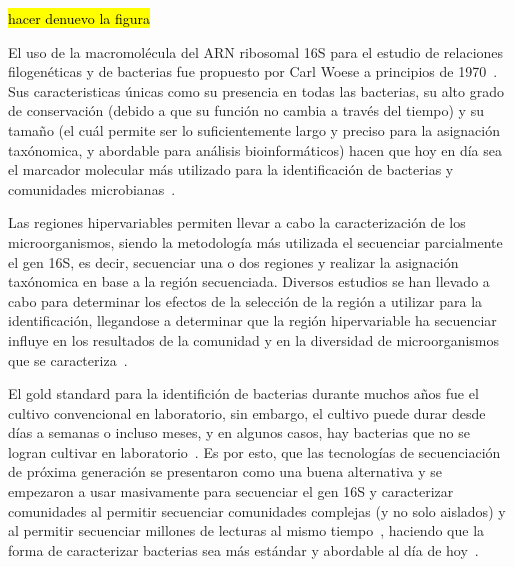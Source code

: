 \hl{hacer denuevo la figura}

El uso de la macromolécula del ARN ribosomal  16S para el estudio de relaciones filogenéticas y de bacterias fue propuesto por Carl Woese a principios de 1970~\cite{olsen1993ribosomal}.
Sus caracteristicas únicas como su presencia en todas las bacterias, su alto grado de conservación (debido a que su función no cambia a través del tiempo) y su tamaño (el cuál permite ser lo suficientemente largo y preciso para la asignación taxónomica, y abordable para análisis bioinformáticos) hacen que hoy en día sea el marcador molecular más utilizado para la identificación de bacterias y comunidades microbianas~\cite{reller2007detection,janda200716s,lopez2023determining,patel200116s}.


Las regiones hipervariables permiten llevar a cabo la caracterización de los microorganismos, siendo la metodología más utilizada el secuenciar parcialmente el gen 16S, es decir, secuenciar una o dos regiones y realizar la asignación taxónomica en base a la región secuenciada. Diversos estudios se han llevado a cabo para determinar los efectos de la selección de la región a utilizar para la identificación, llegandose a determinar que la región hipervariable ha secuenciar influye en los resultados de la comunidad y en la diversidad de microorganismos que se caracteriza~\cite{klindworth2013evaluation,mizrahi2013taxonomic,guo2013taxonomic,soergel2012selection}.




El gold standard para la identifición de bacterias durante muchos años fue el cultivo convencional en laboratorio, sin embargo, el cultivo puede durar desde días a semanas o incluso meses, y en algunos casos, hay bacterias que no se logran cultivar en laboratorio~\cite{didelot2012transforming}. 
Es por esto, que las tecnologías de secuenciación de próxima generación se presentaron como una buena alternativa y se empezaron a usar masivamente para secuenciar el gen 16S y caracterizar comunidades al permitir secuenciar comunidades complejas (y no solo aislados) y al permitir secuenciar millones de lecturas al mismo tiempo~\cite{reller2007detection}, haciendo que la forma de caracterizar bacterias sea más estándar y abordable al día de hoy~\cite{woo2008then, tanner1994impact}. 

